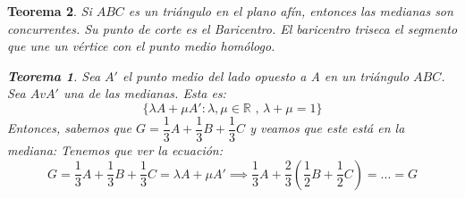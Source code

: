 \documentclass[11pt, a4paper, titlepage]{article}
\newcommand{\R}{\mathbb{R}}
\theoremstyle{theorem-style}
\newtheorem*{nth}{Teorema}
\theoremstyle{definition-style}
\theoremstyle{remark-style}
\theoremstyle{example-style}
\begin{document}
\begin{nth}
	Si $ABC$ es un triángulo en el plano afín, entonces las medianas son concurrentes. Su punto de corte es el Baricentro. El baricentro triseca el segmento que une un vértice con el punto medio homólogo.
	
	\begin{nth}
	Sea $A'$ el punto medio del lado opuesto a A en un triángulo $ABC$. Sea $AvA'$ una de las medianas. Esta es:
	\[
	\{\lambda A + \mu A': \lambda, \mu \in \R \text{ , } \lambda+\mu = 1\}
	\]
	Entonces, sabemos que $G = \dfrac{1}{3} A +  \dfrac{1}{3} B +  \dfrac{1}{3} C$ y veamos que este está en la mediana: Tenemos que ver la ecuación:
	\[
	G = \dfrac{1}{3} A +  \dfrac{1}{3} B +  \dfrac{1}{3} C = \lambda A + \mu A'  \implies \dfrac{1}{3}A + \dfrac{2}{3}(\dfrac{1}{2}B+\dfrac{1}{2}C) = ... = G
	\]
	
\end{nth}
\end{nth}
\end{document}
